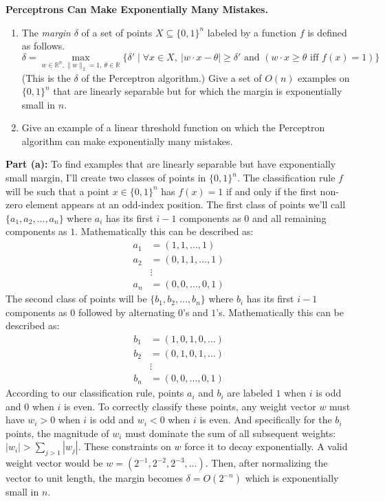 \documentclass[11pt]{article}
\newcommand*{\R}{\mathbb{R}}
\DeclareMathOperator{\1}{\mathbbm{1}}
\begin{document}
\begin{problem}[15 points] \textbf{Perceptrons Can Make Exponentially Many Mistakes.}\
	\begin{enumerate}[label = \alph*)]
		\item The {\em margin} $\delta$ of a set of points $X \subseteq \{0,1\}^n$
		labeled by a function $f$ is defined as follows.  $$\delta = \max_{w \in
			\R^n, \|w\|_2 = 1,\ \theta \in \R} \{ \delta' \mid \forall x \in
		X,\ |w\cdot x - \theta| \geq \delta'  \text{ and }  (w \cdot x \geq \theta
		\text{ iff } f(x) = 1)  \}$$ (This is the $\delta$ of the
		Perceptron algorithm.) Give a set of $O(n)$ examples on $\{0,1\}^n$ that are
		linearly separable but for which the margin is exponentially small in $n$.
		\item Give an example of a linear threshold function on which the Perceptron algorithm can make exponentially many mistakes.
	\end{enumerate}

\textbf{Part (a):} To find examples that are linearly separable but have exponentially small margin, I'll create two classes of points in $\{0,1\}^n$. The classification rule $f$ will be such that a point $x \in \{0,1\}^n$ has $f(x)=1$ if and only if the first non-zero element appears at an odd-index position. The first class of points we'll call $\{a_1, a_2, \ldots, a_n\}$ where $a_i$ has its first $i-1$ components as $0$ and all remaining components as $1$. Mathematically this can be described as:
\begin{align}
	a_1 &= (1,1,\ldots,1) \\
	a_2 &= (0,1,1,\ldots,1) \\
	&\vdots \\
	a_n &= (0,0,\ldots,0,1)
\end{align}
The second class of points will be $\{b_1, b_2, \ldots, b_n\}$ where $b_i$ has its first $i-1$ components as $0$ followed by alternating $0$'s and $1$'s. Mathematically this can be described as:
\begin{align}
	b_1 &= (1,0,1,0,\ldots) \\
	b_2 &= (0,1,0,1,\ldots) \\
	&\vdots \\
	b_n &= (0,0,\ldots,0,1)
\end{align}
According to our classification rule, points $a_i$ and $b_i$ are labeled $1$ when $i$ is odd and $0$ when $i$ is even. To correctly classify these points, any weight vector $w$ must have $w_i > 0$ when $i$ is odd and $w_i < 0$ when $i$ is even. And specifically for the $b_i$ points, the magnitude of $w_i$ must dominate the sum of all subsequent weights: $|w_i| > \sum_{j>1} |w_j|$. These constraints on $w$ force it to decay exponentially. A valid weight vector would be $w = (2^{-1}, 2^{-2}, 2^{-3}, \ldots)$. Then, after normalizing the vector to unit length, the margin becomes $\delta = O(2^{-n})$ which is exponentially small in $n$.


\end{problem}
\end{document}
